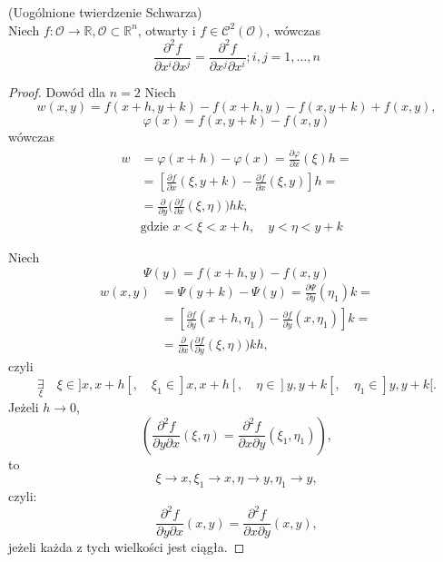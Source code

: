 \documentclass[../main.tex]{subfiles}
\begin{document}
\begin{tw} (Uogólnione twierdzenie Schwarza)\\
Niech $f: \mathcal{O}\to\mathbb{R}, \mathcal{O}\subset \mathbb{R}^n$, otwarty i $f\in\mathcal{C}^2(\mathcal{O})$, wówczas
$$\frac{\partial^2 f}{\partial x^i \partial x^j} = \frac{\partial^2 f}{\partial x^j \partial x^i}; i,j=1,\dots,n$$
\end{tw}

\begin{proof}
    Dowód dla $n=2$
Niech
\[
    w(x,y) = f(x+h,y+k) - f(x+h,y) - f(x,y+k) + f(x,y),
\]
\[
    \varphi(x) = f(x,y+k) - f(x,y)
\]
wówczas
\begin{align*}
    w &=\varphi(x+h) - \varphi(x) = \frac{\partial \varphi}{\partial x} (\xi)h = \\
&=\left[ \frac{\partial f}{\partial x} (\xi, y+k) - \frac{\partial f}{\partial x} (\xi, y) \right]h = \\
    &= \frac{\partial }{\partial y} \Big ( \frac{\partial f}{\partial x} (\xi,\eta) \Big ) hk
,\\
    & \text{gdzie }x<\xi<x+h,\quad y<\eta<y+k
\end{align*}

Niech
\[
    \Psi(y)=f(x+h,y)-f(x,y)
\]
\begin{align*}
    w(x,y) &= \Psi(y+k) - \Psi(y) = \frac{\partial \Psi}{\partial y} (\eta_1)k = \\
    &=  \left[\frac{\partial f}{\partial y} (x+h,\eta_1) - \frac{\partial f}{\partial y} (x,\eta_1) \right] k = \\
    &= \frac{\partial }{\partial x} \Big ( \frac{\partial f}{\partial y} (\xi,\eta) \Big ) kh
,\end{align*}
czyli
\[
    \underset{\xi}{\exists}\quad \xi\in]x,x+h[,\quad \xi_1\in]x,x+h[,\quad \eta\in]y,y+k[,\quad \eta_1\in]y,y+k[.
\]
Jeżeli $h\to 0$,
\[
    \left( \frac{\partial^2 f}{\partial y \partial x} (\xi,\eta) = \frac{\partial^2 f}{\partial x \partial y} (\xi_1,\eta_1) \right)
,\]
to
\[
    \xi \to x, \xi_1 \to x, \eta \to y, \eta_1 \to y
,\]
czyli:
\[
    \frac{\partial^2 f}{\partial y \partial x} (x,y) = \frac{\partial^2 f}{\partial x \partial y} (x,y)
,\]
jeżeli każda z tych wielkości jest ciągła.
\end{proof}
\end{document}
